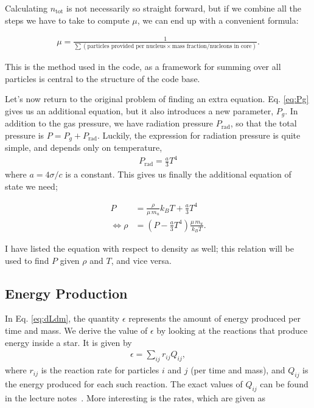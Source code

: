 \documentclass[11pt,twocolumn]{article}
\begin{document}
Calculating $n_\text{tot}$ is not necessarily so straight forward, but
if we combine all the steps we have to take to compute $\mu$, we can
end up with a convenient formula:

\begin{align}
  \mu = \frac{1}{\sum (\text{particles provided per
  nucleus}\times\text{mass fraction}/\text{nucleons in core})}\label{eq:mu_0}.
\end{align}

This is the method used in the code, as a framework for summing over
all particles is central to the structure of the code base.


Let's now return to the original problem of finding an extra
equation. Eq. \eqref{eq:Pg} gives us an additional equation, but it
also introduces a new parameter, $P_g$. In addition to the gas
pressure, we have radiation pressure $P_{\text{rad}}$, so that the
total pressure is $P = P_g + P_\text{rad}$. Luckily, the expression
for radiation pressure is quite simple, and depends only on
temperature,
\begin{align}
  P_\text{rad} = \frac{ a }{ 3 }T^4
\end{align}
where $a = 4\sigma/c$ is a constant. This gives us finally the
additional equation of state we need;

\begin{align}
  P &= \frac{ \rho }{ \mu\,m_u }k_B T + \frac{ a }{ 3 }T^4\label{eq:P-eq_state}\\
  \Leftrightarrow \rho &= (P - \frac{a}{3}T^4) \frac{ \mu\,m_u }{ k_BT }\label{eq:rho-eq_state}.
\end{align}

I have listed the equation with respect to density as well; this
relation will be used to find $P$ given $\rho$ and $T$, and vice
versa.


\subsection{Energy Production}
In Eq. \eqref{eq:dLdm}, the quantity $\epsilon$ represents the amount
of energy produced per time and mass. We derive the value of
$\epsilon$ by looking at the reactions that produce energy inside a
star. It is given by
\begin{align}
  \epsilon = \sum_{ij}r_{ij}Q_{ij},
\end{align}
where $r_{ij}$ is the reaction rate for particles $i$ and $j$ (per
time and mass), and $Q_{ij}$ is the energy produced for each such
reaction. The exact values of $Q_{ij}$ can be found in the lecture
notes~\cite{lecture-notes}. More interesting is the rates, which are
given as
\end{document}
